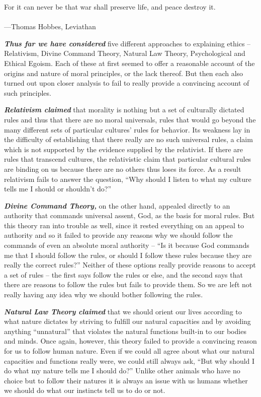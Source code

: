 \documentclass[12pt, openany]{book}
\newenvironment{epigraph}%
{
\begin{flushright}
\begin{minipage}{30em}
\begin{flushright}
\itshape
}%
{
\end{flushright}
\end{minipage}
\end{flushright}
\vspace{1em}
}
\begin{document}
\begin{epigraph}

For it can never be that war shall preserve life, and peace destroy it.\\
~\\
---Thomas Hobbes, Leviathan

\end{epigraph}

\textbf{\emph{Thus far we have considered}} five different approaches to explaining ethics -- Relativism, Divine Command Theory, Natural Law Theory, Psychological and Ethical Egoism. Each of these at first seemed to offer a reasonable account of the origins and nature of moral principles, or the lack thereof. But then each also turned out upon closer analysis to fail to really provide a convincing account of such principles.

\textbf{\emph{Relativism claimed}} that morality is nothing but a set of culturally dictated rules and thus that there are no moral universals, rules that would go beyond the many different sets of particular cultures' rules for behavior. Its weakness lay in the difficulty of establishing that there really are no such universal rules, a claim which is not supported by the evidence supplied by the relativist. If there are rules that transcend cultures, the relativistic claim that particular cultural rules are binding on us because there are no others thus loses its force. As a result relativism fails to answer the question, ``Why should I listen to what my culture tells me I should or shouldn't do?''

\textbf{\emph{Divine Command Theory,}} on the other hand, appealed directly to an authority that commands universal assent, God, as the basis for moral rules. But this theory ran into trouble as well, since it rested everything on an appeal to authority and so it failed to provide any reasons why we should follow the commands of even an absolute moral authority -- ``Is it because God commands me that I should follow the rules, or should I follow these rules because they are really the correct rules?'' Neither of these options really provide reasons to accept a set of rules -- the first says follow the rules or else, and the second says that there are reasons to follow the rules but fails to provide them. So we are left not really having any idea why we should bother following the rules.

\textbf{\emph{Natural Law Theory claimed}} that we should orient our lives according to what nature dictates by striving to fulfill our natural capacities and by avoiding anything ``unnatural'' that violates the natural functions built-in to our bodies and minds. Once again, however, this theory failed to provide a convincing reason for us to follow human nature. Even if we could all agree about what our natural capacities and functions really were, we could still always ask, ``But why should I do what my nature tells me I should do?'' Unlike other animals who have no choice but to follow their natures it is always an issue with us humans whether we should do what our instincts tell us to do or not.
\end{document}
